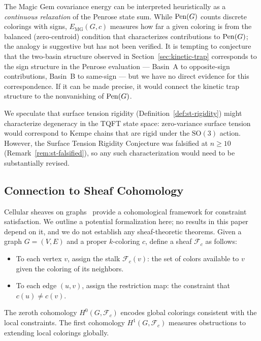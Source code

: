 The Magic Gem covariance energy can be interpreted heuristically as a
\emph{continuous relaxation} of the Penrose state sum. While $\operatorname{Pen}(G)$
counts discrete colorings with signs, $E_{\mathrm{MG}}(G, c)$ measures
how far a given coloring is from the balanced (zero-centroid) condition
that characterizes contributions to $\operatorname{Pen}(G)$; the analogy is
suggestive but has not been verified. It is tempting to conjecture that the
two-basin structure observed in Section~\ref{sec:kinetic-trap}
corresponds to the sign structure in the Penrose evaluation —
Basin~A to opposite-sign contributions, Basin~B to same-sign — but we
have no direct evidence for this correspondence. If it can be made
precise, it would connect the kinetic trap structure to the
nonvanishing of $\operatorname{Pen}(G)$.

\begin{remark}\label{rem:tqft-rigidity}
We speculate that surface tension rigidity
(Definition~\ref{def:st-rigidity}) might characterize degeneracy in the
TQFT state space: zero-variance surface tension would correspond to
Kempe chains that are rigid under the $\mathrm{SO}(3)$ action. However,
the Surface Tension Rigidity Conjecture was falsified at $n \geq 10$
(Remark~\ref{rem:st-falsified}), so any such characterization would
need to be substantially revised.
\end{remark}

\subsection{Connection to Sheaf Cohomology}\label{sec:sheaf}

Cellular sheaves on graphs~\cite{ghrist2014} provide a cohomological
framework for constraint satisfaction. We outline a potential
formalization here; no results in this paper depend on it, and we do not
establish any sheaf-theoretic theorems. Given a graph $G = (V, E)$ and
a proper $k$-coloring $c$, define a sheaf $\mathcal{F}_c$ as follows:
\begin{itemize}
  \item To each vertex $v$, assign the stalk $\mathcal{F}_c(v)$: the
    set of colors available to $v$ given the coloring of its neighbors.
  \item To each edge $(u, v)$, assign the restriction map: the
    constraint that $c(u) \neq c(v)$.
\end{itemize}
The zeroth cohomology $H^0(G, \mathcal{F}_c)$ encodes global colorings
consistent with the local constraints. The first cohomology
$H^1(G, \mathcal{F}_c)$ measures obstructions to extending local
colorings globally.

